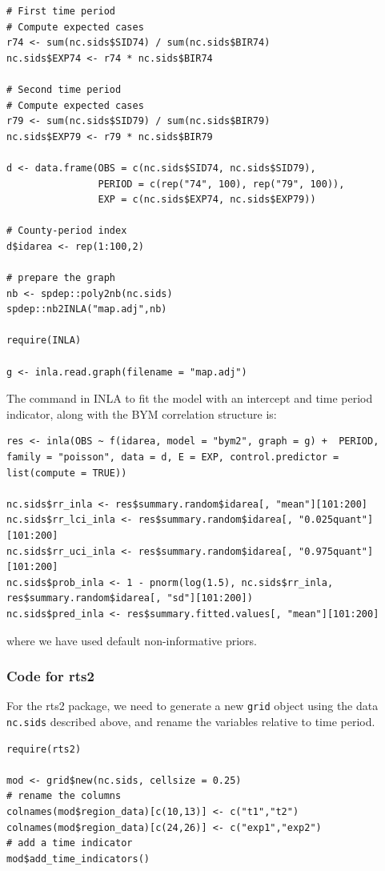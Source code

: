 \begin{lstlisting}
# First time period
# Compute expected cases
r74 <- sum(nc.sids$SID74) / sum(nc.sids$BIR74)
nc.sids$EXP74 <- r74 * nc.sids$BIR74

# Second time period
# Compute expected cases
r79 <- sum(nc.sids$SID79) / sum(nc.sids$BIR79)
nc.sids$EXP79 <- r79 * nc.sids$BIR79

d <- data.frame(OBS = c(nc.sids$SID74, nc.sids$SID79),
                PERIOD = c(rep("74", 100), rep("79", 100)), 
                EXP = c(nc.sids$EXP74, nc.sids$EXP79))

# County-period index
d$idarea <- rep(1:100,2)

# prepare the graph
nb <- spdep::poly2nb(nc.sids)
spdep::nb2INLA("map.adj",nb)

require(INLA)

g <- inla.read.graph(filename = "map.adj")
\end{lstlisting}

The command in INLA to fit the model with an intercept and time period indicator, along with the BYM correlation structure is:

\begin{lstlisting}
res <- inla(OBS ~ f(idarea, model = "bym2", graph = g) +  PERIOD, family = "poisson", data = d, E = EXP, control.predictor = list(compute = TRUE))

nc.sids$rr_inla <- res$summary.random$idarea[, "mean"][101:200]
nc.sids$rr_lci_inla <- res$summary.random$idarea[, "0.025quant"][101:200]
nc.sids$rr_uci_inla <- res$summary.random$idarea[, "0.975quant"][101:200]
nc.sids$prob_inla <- 1 - pnorm(log(1.5), nc.sids$rr_inla, res$summary.random$idarea[, "sd"][101:200])
nc.sids$pred_inla <- res$summary.fitted.values[, "mean"][101:200]
\end{lstlisting}

where we have used default non-informative priors.

\subsubsection{Code for rts2}
For the rts2 package, we need to generate a new \texttt{grid} object using the data \texttt{nc.sids} described above, and rename the variables relative to time period. 

\begin{lstlisting}
require(rts2)

mod <- grid$new(nc.sids, cellsize = 0.25)
# rename the columns 
colnames(mod$region_data)[c(10,13)] <- c("t1","t2")
colnames(mod$region_data)[c(24,26)] <- c("exp1","exp2")
# add a time indicator
mod$add_time_indicators()
\end{lstlisting}

